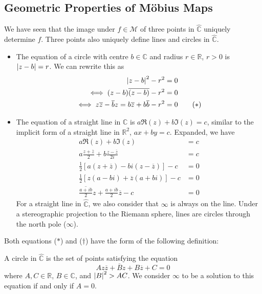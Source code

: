 \documentclass{article}
\begin{document}
\subsection{Geometric Properties of M\"obius Maps}
We have seen that the image under $f \in \mathcal M$ of three points in $\hat{\mathbb C}$ uniquely determine $f$. Three points also uniquely define lines and circles in $\hat{\mathbb C}$.
\begin{itemize}
    \item The equation of a circle with centre $b \in \mathbb C$ and radius $r \in \mathbb R$, $r > 0$ is $\abs{z-b} = r$. We can rewrite this as
          \begin{align*}
              \abs{z-b}^2 - r^2                                                        & = 0              \\
              \iff (z-b)\overline{(z-b)} - r^2                                         & = 0              \\
              \iff z\overline{z} - \overline{b}z = b\overline{z} + b\overline{b} - r^2 & = 0 \tag{$\ast$}
          \end{align*}
    \item The equation of a straight line in $\mathbb C$ is $a \Re(z) + b \Im(z) = c$, similar to the implicit form of a straight line in $\mathbb R^2$, $ax+by=c$. Expanded, we have
          \begin{align*}
              a \Re(z) + b \Im(z)                                                      & = c                 \\
              a \frac{z + \overline z}{2} + b \frac{z - \overline z}{2i}               & = c                 \\
              \frac{1}{2}\left[ a (z + \overline z) - bi (z - \overline z) \right] - c & = 0                 \\
              \frac{1}{2}\left[ z(a-bi) + \overline z(a+bi) \right] - c                & = 0                 \\
              \overline{\frac{a + ib}{2}}z + \frac{a+ib}{2}\overline{z} - c            & = 0 \tag{$\dagger$}
          \end{align*}
          For a straight line in $\hat{\mathbb C}$, we also consider that $\infty$ is always on the line. Under a stereographic projection to the Riemann sphere, lines are circles through the north pole ($\infty$).
\end{itemize}
Both equations ($\ast$) and ($\dagger$) have the form of the following definition:
\begin{definition}
    A circle in $\hat{\mathbb C}$ is the set of points satisfying the equation
    \[ Az\overline z + \overline B z + B \overline z + C = 0 \]
    where $A, C \in \mathbb R$, $B \in \mathbb C$, and $\abs{B}^2 > AC$. We consider $\infty$ to be a solution to this equation if and only if $A = 0$.
\end{definition}
\end{document}

